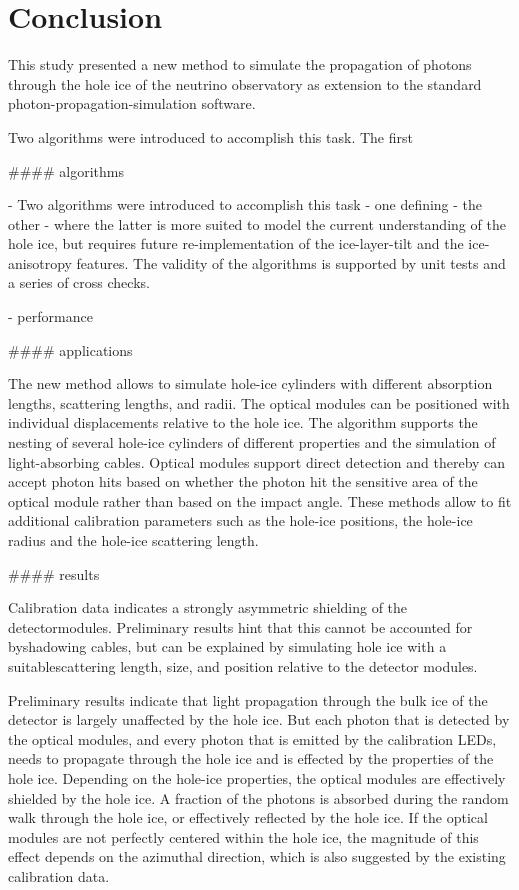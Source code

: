 
\section{Conclusion}
\label{sec:conclusion}

This study presented a new method to simulate the propagation of photons through the hole ice of the \icecube neutrino observatory as extension to the standard \clsim photon-propagation-simulation software.

Two algorithms were introduced to accomplish this task. The first

#### algorithms

- Two algorithms were introduced to accomplish this task
- one defining
- the other
- where the latter is more suited to model the current understanding of the hole ice, but requires future re-implementation of the ice-layer-tilt and the ice-anisotropy features. The validity of the algorithms is supported by unit tests and a series of cross checks.

- performance


#### applications

The new method allows to simulate hole-ice cylinders with different absorption lengths, scattering lengths, and radii. The optical modules can be positioned with individual displacements relative to the hole ice. The algorithm supports the nesting of several hole-ice cylinders of different properties and the simulation of light-absorbing cables. Optical modules support direct detection and thereby can accept photon hits based on whether the photon hit the sensitive area of the optical module rather than based on the impact angle. These methods allow to fit additional calibration parameters such as the hole-ice positions, the hole-ice radius and the hole-ice scattering length.


#### results

Calibration data indicates a strongly asymmetric shielding of the detectormodules.   Preliminary  results  hint  that  this  cannot  be  accounted  for  byshadowing cables, but can be explained by simulating hole ice with a suitablescattering length, size, and position relative to the detector modules.

Preliminary results indicate that light propagation through the bulk ice of the \icecube detector is largely unaffected by the hole ice. But each photon that is detected by the optical modules, and every photon that is emitted by the calibration LEDs, needs to propagate through the hole ice and is effected by the properties of the hole ice.
Depending on the hole-ice properties, the optical modules are effectively shielded by the hole ice. A fraction of the photons is absorbed during the random walk through the hole ice, or effectively reflected by the hole ice. If the optical modules are not perfectly centered within the hole ice, the magnitude of this effect depends on the azimuthal direction, which is also suggested by the existing calibration data.

